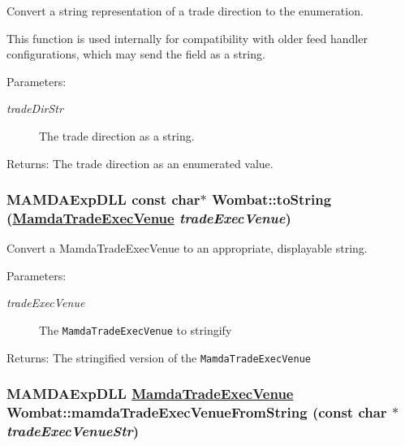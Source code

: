 Convert a string representation of a trade direction to the enumeration. 

This function is used internally for compatibility with older feed handler configurations, which may send the field as a string.

\begin{Desc}
\item[Parameters:]
\begin{description}
\item[{\em trade\-Dir\-Str}]The trade direction as a string.\end{description}
\end{Desc}
\begin{Desc}
\item[Returns:]The trade direction as an enumerated value. \end{Desc}
\hypertarget{namespaceWombat_2cdfa338b0576698d5e838cee79d1a2d}{
\subsubsection[toString]{\setlength{\rightskip}{0pt plus 5cm}MAMDAExp\-DLL const char$\ast$ Wombat::to\-String (\hyperlink{namespaceWombat_daf4c098665070a9e45bf835bad3548a}{Mamda\-Trade\-Exec\-Venue} {\em trade\-Exec\-Venue})}}
\label{namespaceWombat_2cdfa338b0576698d5e838cee79d1a2d}


Convert a Mamda\-Trade\-Exec\-Venue to an appropriate, displayable string. 

\begin{Desc}
\item[Parameters:]
\begin{description}
\item[{\em trade\-Exec\-Venue}]The {\tt Mamda\-Trade\-Exec\-Venue} to stringify\end{description}
\end{Desc}
\begin{Desc}
\item[Returns:]The stringified version of the {\tt Mamda\-Trade\-Exec\-Venue} \end{Desc}
\hypertarget{namespaceWombat_7e9c4d36706b3a14991d10fe239d4e18}{
\subsubsection[mamdaTradeExecVenueFromString]{\setlength{\rightskip}{0pt plus 5cm}MAMDAExp\-DLL \hyperlink{namespaceWombat_daf4c098665070a9e45bf835bad3548a}{Mamda\-Trade\-Exec\-Venue} Wombat::mamda\-Trade\-Exec\-Venue\-From\-String (const char $\ast$ {\em trade\-Exec\-Venue\-Str})}}
\label{namespaceWombat_7e9c4d36706b3a14991d10fe239d4e18}


